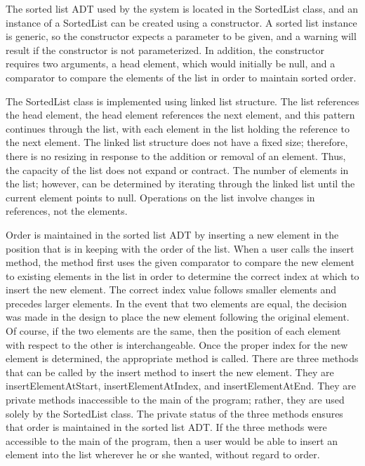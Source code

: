 \documentclass[12pt]{scrartcl} %
\begin{document}
    The sorted list ADT used by the system is located in the SortedList class, and an instance of a SortedList can be created using a constructor.  A sorted list instance is generic, so the constructor expects a parameter to be given, and a warning will result if the constructor is not parameterized.  In addition, the constructor requires two arguments, a head element, which would initially be null, and a comparator to compare the elements of the list in order to maintain sorted order.

    The SortedList class is implemented using linked list structure.  The list references the head element, the head element references the next element, and this pattern continues through the list, with each element in the list holding the reference to the next element.  The linked list structure does not have a fixed size; therefore, there is no resizing in response to the addition or removal of an element.  Thus, the capacity of the list does not expand or contract.  The number of elements in the list; however, can be determined by iterating through the linked list until the current element points to null.  Operations on the list involve changes in references, not the elements.

    Order is maintained in the sorted list ADT by inserting a new element in the position that is in keeping with the order of the list.  When a user calls the insert method, the method first uses the given comparator to compare the new element to existing elements in the list in order to determine the correct index at which to insert the new element.  The correct index value follows smaller elements and precedes larger elements.  In the event that two elements are equal, the decision was made in the design to place the new element following the original element.  Of course, if the two elements are the same, then the position of each element with respect to the other is interchangeable.  Once the proper index for the new element is determined, the appropriate method is called.  There are three methods that can be called by the insert method to insert the new element.  They are insertElementAtStart, insertElementAtIndex, and insertElementAtEnd.  They are private methods inaccessible to the main of the program; rather, they are used solely by the SortedList class.  The private status of the three methods ensures that order is maintained in the sorted list ADT.  If the three methods were accessible to the main of the program, then a user would be able to insert an element into the list wherever he or she wanted, without regard to order.
\end{document}
